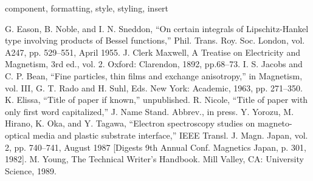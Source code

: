\documentclass[conference]{IEEEtran}
\begin{document}
\begin{IEEEkeywords}
component, formatting, style, styling, insert
\end{IEEEkeywords}

\begin{thebibliography}{00}
 G. Eason, B. Noble, and I. N. Sneddon, ``On certain integrals of Lipschitz-Hankel type involving products of Bessel functions,'' Phil. Trans. Roy. Soc. London, vol. A247, pp. 529--551, April 1955.
 J. Clerk Maxwell, A Treatise on Electricity and Magnetism, 3rd ed., vol. 2. Oxford: Clarendon, 1892, pp.68--73.
 I. S. Jacobs and C. P. Bean, ``Fine particles, thin films and exchange anisotropy,'' in Magnetism, vol. III, G. T. Rado and H. Suhl, Eds. New York: Academic, 1963, pp. 271--350.
 K. Elissa, ``Title of paper if known,'' unpublished.
 R. Nicole, ``Title of paper with only first word capitalized,'' J. Name Stand. Abbrev., in press.
 Y. Yorozu, M. Hirano, K. Oka, and Y. Tagawa, ``Electron spectroscopy studies on magneto-optical media and plastic substrate interface,'' IEEE Transl. J. Magn. Japan, vol. 2, pp. 740--741, August 1987 [Digests 9th Annual Conf. Magnetics Japan, p. 301, 1982].
 M. Young, The Technical Writer's Handbook. Mill Valley, CA: University Science, 1989.
\end{thebibliography}
\vspace{12pt}
\end{document}
